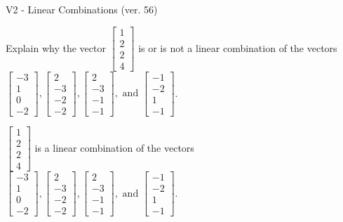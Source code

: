 \begin{exercise}
  \begin{exerciseTitle}V2 - Linear Combinations (ver. 56)\end{exerciseTitle}
  \begin{exerciseStatement}
    Explain why the vector \(\left[\begin{array}{c}
1 \\
2 \\
2 \\
4
\end{array}\right]\)  is or is not a linear 
	combination of the vectors \(\left[\begin{array}{c}
-3 \\
1 \\
0 \\
-2
\end{array}\right] , \left[\begin{array}{c}
2 \\
-3 \\
-2 \\
-2
\end{array}\right] , \left[\begin{array}{c}
2 \\
-3 \\
-1 \\
-1
\end{array}\right] , \text{ and } \left[\begin{array}{c}
-1 \\
-2 \\
1 \\
-1
\end{array}\right]\).
	


  \end{exerciseStatement}
  \begin{exerciseAnswer}
   \(\left[\begin{array}{c}
1 \\
2 \\
2 \\
4
\end{array}\right]\) 
  	 is  
	a linear combination of the vectors \(\left[\begin{array}{c}
-3 \\
1 \\
0 \\
-2
\end{array}\right] , \left[\begin{array}{c}
2 \\
-3 \\
-2 \\
-2
\end{array}\right] , \left[\begin{array}{c}
2 \\
-3 \\
-1 \\
-1
\end{array}\right] , \text{ and } \left[\begin{array}{c}
-1 \\
-2 \\
1 \\
-1
\end{array}\right]\).


\end{exerciseAnswer}
\end{exercise}

